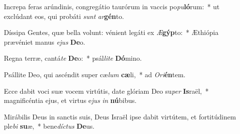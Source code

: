 \item Increpa feras arúndinis, congregátio taurórum in vaccis po\textit{pu}\textbf{ló}rum:~* ut exclúdant eos, qui probáti \textit{sunt} \textit{ar}\textbf{gén}to.
\item Díssipa Gentes, quæ bella volunt: vénient legáti ex \textit{Æ}\textbf{gýp}to:~* Æthiópia prævéniet manus \textit{e}\textit{jus} \textbf{De}o.
\item Regna terræ, cantá\textit{te} \textbf{De}o:~* psál\textit{li}\textit{te} \textbf{Dó}mino.
\item Psállite Deo, qui ascéndit super cæ\textit{lum} \textbf{cæ}li,~* ad \textit{O}\textit{ri}\textbf{én}tem.
\item Ecce dabit voci suæ vocem virtútis, date glóriam Deo su\textit{per} \textbf{Is}raël,~* magnificéntia ejus, et virtus e\textit{jus} \textit{in} \textbf{nú}bibus.
\item Mirábilis Deus in sanctis suis, Deus Israël ipse dabit virtútem, et fortitúdinem ple\textit{bi} \textbf{su}æ,~* bene\textit{díc}\textit{tus} \textbf{De}us.
